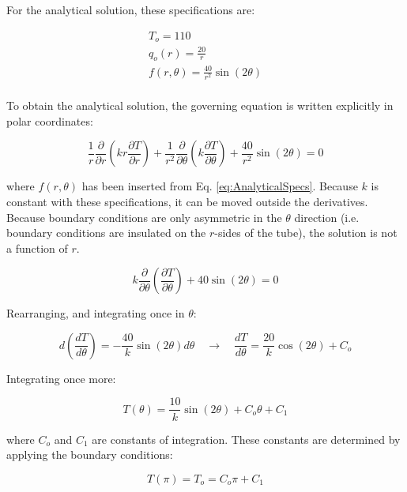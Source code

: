 \documentclass[10pt]{article}
\begin{document}
For the analytical solution, these specifications are:

\begin{equation}
\label{eq:AnalyticalSpecs}
\begin{aligned}
T_o=110\\
q_o(r)=\frac{20}{r}\\
f(r,\theta)=\frac{40}{r^2}\sin{(2\theta)}\\
\end{aligned}
\end{equation}

To obtain the analytical solution, the governing equation is written explicitly in polar coordinates:

\begin{equation}
\frac{1}{r}\frac{\partial}{\partial r}\left(kr\frac{\partial T}{\partial r}\right)+\frac{1}{r^2}\frac{\partial}{\partial\theta}\left(k\frac{\partial T}{\partial\theta}\right)+\frac{40}{r^2}\sin{(2\theta)}=0
\end{equation}

where \(f(r,\theta)\) has been inserted from Eq. \eqref{eq:AnalyticalSpecs}. Because \(k\) is constant with these specifications, it can be moved outside the derivatives. Because boundary conditions are only asymmetric in the \(\theta\) direction (i.e. boundary conditions are insulated on the \(r\)-sides of the tube), the solution is not a function of \(r\). 

\begin{equation}
k\frac{\partial}{\partial\theta}\left(\frac{\partial T}{\partial\theta}\right)+40\sin{(2\theta)}=0
\end{equation}

Rearranging, and integrating once in \(\theta\):

\begin{equation}
d\left(\frac{d T}{d\theta}\right)=-\frac{40}{k}\sin{(2\theta)}d\theta\quad\rightarrow\quad \frac{dT}{d\theta}=\frac{20}{k}\cos{(2\theta)}+C_o
\end{equation}

Integrating once more:

\begin{equation}
T(\theta)=\frac{10}{k}\sin{(2\theta)}+C_o\theta+C_1
\end{equation}

where \(C_o\) and \(C_1\) are constants of integration. These constants are determined by applying the boundary conditions:

\begin{equation}
T(\pi)=T_o=C_o\pi+C_1
\end{equation}
\end{document}
